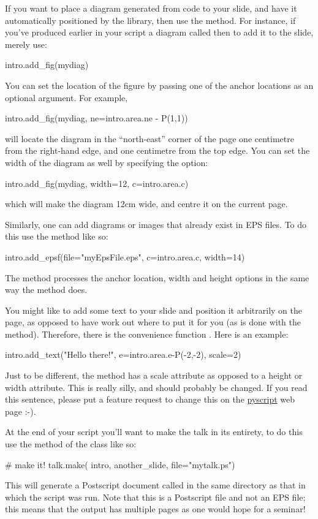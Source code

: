 If you want to place a diagram generated from \pyscript code to your slide,
and have it automatically positioned by the library, then use the
 method.  For instance, if you've produced earlier in your
\pyscript script a diagram called  then to add it to the slide,
merely use:
\begin{python}
intro.add_fig(mydiag)
\end{python}
You can set the location of the figure by passing one of the \pyscript anchor
locations as an optional argument.  For example,
\begin{python}
intro.add_fig(mydiag, ne=intro.area.ne - P(1,1))
\end{python}
will locate the diagram in the ``north-east'' corner of the page one
centimetre from the right-hand edge, and one centimetre from the top edge.
You can set the width of the diagram as well by specifying the 
option:
\begin{python}
intro.add_fig(mydiag, width=12, c=intro.area.c)
\end{python}
which will make the diagram 12cm wide, and centre it on the current page.

Similarly, one can add diagrams or images that already exist in EPS files.
To do this use the  method like so:
\begin{python}
intro.add_epsf(file="myEpsFile.eps", c=intro.area.c, width=14)
\end{python}
The  method processes the anchor location, width and height
options in the same way the  method does.

You might like to add some text to your slide and position it arbitrarily on
the page, as opposed to have  work out where to put it
for you (as is done with the  method).  Therefore, there
is the convenience function .  Here is an example:
\begin{python}
intro.add_text("Hello there!", e=intro.area.e-P(-2,-2), scale=2)
\end{python}
Just to be different, the  method has a scale attribute as
opposed to a height or width attribute.  This is really silly, and should
probably be changed.  If you read this sentence, please put a feature
request to change this on the \href{http://pyscript.sf.net}{pyscript} web
page :-).

At the end of your script you'll want to make the talk in its entirety, to
do this use the  method of the  class like so:
\begin{python}
# make it!
talk.make(
    intro,
    another_slide,
    file="mytalk.ps")
\end{python}
This will generate a Postscript document called  in the same
directory as that in which the \pyscript script was run.  Note that this is
a Postscript file and not an EPS file; this means that the output has
multiple pages as one would hope for a seminar!

